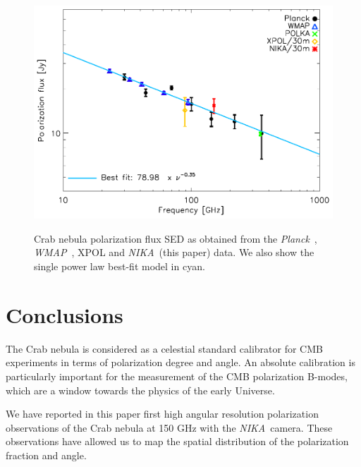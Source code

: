 \documentclass[twocolumn,traditabstract]{aa}
\def\NIKA{\textit{NIKA}}
\def\Planck{\textit{Planck}}
\def\WMAP{\textit{WMAP}}
\begin{document}
\begin{figure}
  \centering
             { \includegraphics[width=1\linewidth,keepaspectratio]{figures/Crab_SED_ipol_test.pdf}}
           \caption{Crab nebula polarization flux SED as obtained from the \Planck\ \citep{2015arXiv150702058P}, \WMAP\ \citep{2011ApJS..192...19W}, XPOL \citep{aumont2010} and \NIKA\ (this paper) data. We also show the single power law best-fit model in cyan.}
\label{crab_SED_ipol}		
  \end{figure} 
 \noindent


\section{Conclusions}\label{sec:conclusions}
The Crab nebula is considered as a celestial standard calibrator for CMB experiments in
terms of polarization degree and angle. An absolute calibration is
particularly important for the measurement of the CMB polarization B-modes,
which are a window towards the physics of the early Universe.

We have reported in this paper first high angular resolution polarization observations
of the Crab nebula at 150 GHz with the \NIKA\ camera. These observations have
allowed us to map the spatial distribution of the polarization
fraction and angle.  
\end{document}
